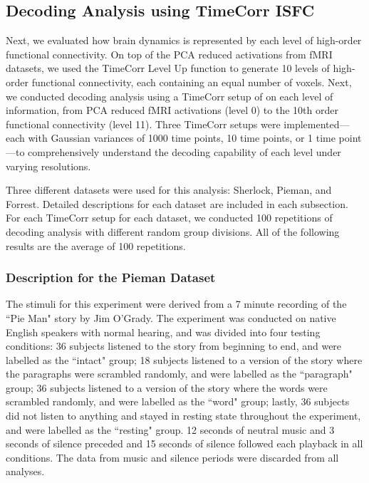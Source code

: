 \documentclass[11pt]{article}
\begin{document}
\subsection{Decoding Analysis using TimeCorr ISFC}
Next, we evaluated how brain dynamics is represented by each level of high-order functional connectivity. On top of the PCA reduced activations from fMRI datasets, we used the TimeCorr Level Up function to generate 10 levels of high-order functional connectivity, each containing an equal number of voxels. Next, we conducted decoding analysis using a TimeCorr setup of on each level of information, from PCA reduced fMRI activations (level 0) to the 10th order functional connectivity (level 11). Three TimeCorr setups were implemented---each with Gaussian variances of 1000 time points, 10 time points, or 1 time point---to comprehensively understand the decoding capability of each level under varying resolutions.

Three different datasets were used for this analysis: Sherlock, Pieman, and Forrest. Detailed descriptions for each dataset are included in each subsection. For each TimeCorr setup for each dataset, we conducted 100 repetitions of decoding analysis with different random group divisions. All of the following results are the average of 100 repetitions.

\subsubsection{Description for the Pieman Dataset}

The stimuli for this experiment were derived from a 7 minute recording of the ``Pie Man" story by Jim O'Grady. The experiment was conducted on native English speakers with normal hearing, and was divided into four testing conditions: 36 subjects listened to the story from beginning to end, and were labelled as the ``intact" group; 18 subjects listened to a version of the story where the paragraphs were scrambled randomly, and were labelled as the ``paragraph" group; 36 subjects listened to a version of the story where the words were scrambled randomly, and were labelled as the ``word" group; lastly, 36 subjects did not listen to anything and stayed in resting state throughout the experiment, and were labelled as the ``resting" group. 12 seconds of neutral music and 3 seconds of silence preceded and 15 seconds of silence followed each playback in all conditions. The data from music and silence periods were discarded from all analyses.\cite{hasson2016}
\end{document}

